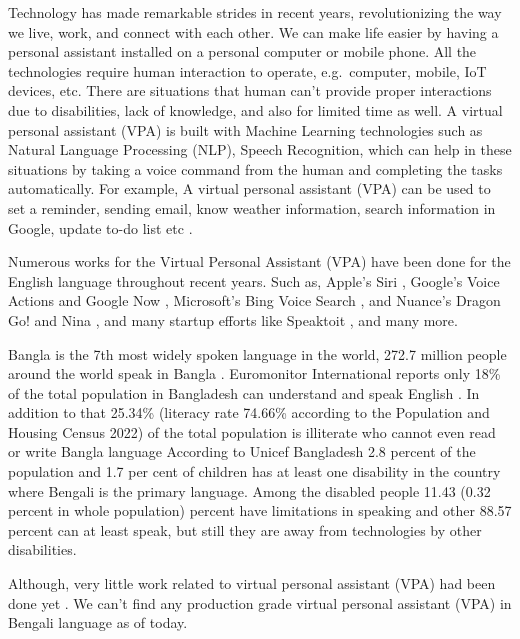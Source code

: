 Technology has made remarkable strides in recent years, revolutionizing the way we live, work, and connect with each other.
We can make life easier by having a personal assistant installed on a personal computer or mobile phone.
All the technologies require human interaction to operate, e.g.\ computer, mobile, IoT devices, etc.
There are situations that human can't provide proper interactions due to disabilities, lack of knowledge, and also for limited time as well.
A virtual personal assistant (VPA) is built with Machine Learning technologies such as Natural Language Processing (NLP), Speech Recognition, which can help in these situations by taking a voice command from the human and completing the tasks automatically.
For example, A virtual personal assistant (VPA) can be used to set a reminder, sending email, know weather information, search information in Google, update to-do list etc \cite{adheetee}.

Numerous works for the Virtual Personal Assistant (VPA) have been done for the English language throughout recent years.
Such as, Apple’s Siri \cite{siri}, Google’s Voice Actions \cite{google-mobile} and Google Now \cite{google-now}, Microsoft’s Bing Voice Search \cite{microsoft-tellme}, and Nuance’s Dragon Go! \cite{nuance-dragon} and Nina \cite{nuance-nina}, and many startup efforts like Speaktoit \cite{speaktoit}, and many more.

Bangla is the 7th most widely spoken language in the world, 272.7 million people around the world speak in Bangla \cite{mostspoken}.
Euromonitor International reports only 18\% of the total population in Bangladesh can understand and speak English \cite{english-speaker-bangladesh}.
In addition to that 25.34\% (literacy rate 74.66\% according to the Population and Housing Census 2022) of the total population is illiterate who cannot even read or write Bangla language \cite{litaracy-bangladesh}
According to Unicef Bangladesh 2.8 percent of the population and 1.7 per cent of children has at least one disability \cite{disabled-stats} in the country where Bengali is the primary language.
Among the disabled people 11.43 (0.32 percent in whole population) percent have limitations in speaking and other 88.57 percent can at least speak, but still they are away from technologies by other disabilities.

Although, very little work related to virtual personal assistant (VPA) had been done yet \cite{adheetee}.
We can't find any production grade virtual personal assistant (VPA) in Bengali language as of today.

